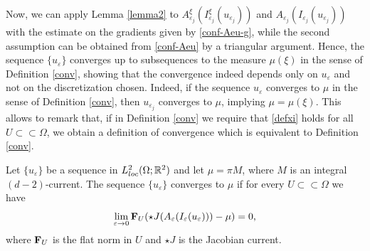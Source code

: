 \documentclass[10pt,a4paper]{amsart}
\def\e{\varepsilon}
\begin{document}
\begin{remark}
Now, we can apply Lemma \ref{lemma2} to $A^\xi_{\e_j}(I_{\e_j}^\xi(u_{\e_j}))$ and $A_{\e_j}(I_{\e_j}(u_{\e_j}))$ with the estimate on the gradients given by \eqref{conf-Aeu-g}, while the second assumption can be obtained from \eqref{conf-Aeu} by a triangular argument. 
Hence, the sequence $\{u_\e\}$ converges up to subsequences to the measure $\mu(\xi)$ in the sense of Definition \ref{conv},  
showing that the convergence indeed depends only on $u_\e$ and not on the discretization chosen.
Indeed, if the sequence $u_\e$ converges to $\mu$ in the sense of Definition \ref{conv}, 
then $u_{\e_j}$ converges to $\mu$, implying $\mu=\mu(\xi)$. 
This allows to remark that, if in Definition \ref{conv} we require that \eqref{defxi} holds 
for all $U\subset\subset\Omega$, 
we obtain a definition of convergence which is equivalent to Definition \ref{conv}. 
\end{remark}

\begin{definition}[Convergence]\label{conv}
Let $\{u_\e\}$ be a sequence in $L^2_{\rm loc}(\Omega;\mathbb R^2)$ and let $\mu=\pi M$, where 
$M$ is an integral $(d-2)$-current.  
The sequence $\{u_\e\}$ {\rm converges to} $\mu$ if 
for every $U\subset\subset\Omega$ we have  
$$\lim_{\e\to 0}{\bf F}_U(\star J(A_\e(I_\e(u_\e)))-\mu)=0,$$
where ${\bf F}_U$ is the flat norm in $U$ and $\star J$ is the Jacobian current. 
\end{definition}
\end{document}
